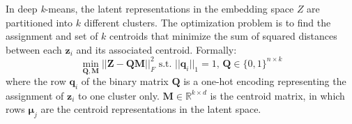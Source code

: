 \documentclass[times, review, 10pt]{elsarticle}
\begin{document}
In deep \textit{k}-means, the latent representations in the embedding space $\textit{Z}$ are partitioned into $\textit{k}$ different clusters. The optimization problem is to find the assignment and set of $\textit{k}$ centroids that minimize the sum of squared distances between each $\mathbf{z}_i$ and its associated centroid. Formally:
%
\begin{equation}
\min_{\mathbf{Q},\mathbf{M}} \lvert\lvert \mathbf{Z} - \mathbf{Q}\mathbf{M} \rvert\rvert_F^2 \text{ s.t. $\lvert\lvert \mathbf{q}_i \rvert\rvert_1 = 1$} \text{, $\mathbf{Q} \in \{0, 1\}^{n \times k}$}
\end{equation}
%
where the row $\mathbf{q}_i$ of the binary matrix $\mathbf{Q}$ is a one-hot encoding representing the assignment of $\mathbf{z}_i$ to one cluster only. $\mathbf{M} \in \mathbb{R}^{k \times d}$ is the centroid matrix, in which rows $\bm{\mu}_j$ are the centroid representations in the latent space.
\end{document}
